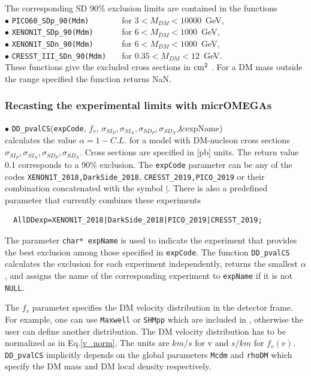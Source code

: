 \documentclass[12pt,a4paper]{article}
\begin{document}
\noindent
The corresponding SD 90\% exclusion limits are contained in the functions\\

\noindent 
$\bullet$ \verb|PICO60_SDp_90(Mdm)       | for  $ 3 < M_{DM} < 10000$~GeV,  \cite{Amole:2019fdf} \\
\noindent
$\bullet$ \verb|XENON1T_SDp_90(Mdm)      | for  $ 6 <  M_{DM} < 1000$~GeV, \cite{Aprile:2019dbj} \\
\noindent
$\bullet$ \verb|XENON1T_SDn_90(Mdm)      | for  $ 6 <  M_{DM} < 1000$~GeV, \cite{Aprile:2019dbj} \\
\noindent
$\bullet$ \verb|CRESST_III_SDn_90(Mdm)   |  for $ 0.35 < M_{DM} < 12$~GeV. ~\cite{Abdelhameed:2019hmk}\\


These functions give the  excluded cross sections in ${\rm cm}^2$ . For a DM mass outside the range specified the function returns NaN.

\subsubsection{Recasting the experimental limits with  micrOMEGAs}  
\label{Recasting}


\noindent
$\bullet$ \verb|DD_pvalCS|(\verb|expCode|, $f_v$, $\sigma_{SI_P},\sigma_{SI_N},\sigma_{SD_P}, \sigma_{SD_N}$,\&expName)\\
calculates the  value $\alpha= 1-C.L.$  for a model with DM-nucleon cross sections 
$\sigma_{SI_P},\sigma_{SI_N},\sigma_{SD_P}, \sigma_{SD_N}$. Cross sections are specified in
[pb] units. The return value 0.1 corresponds to a 90\% exclusion.   
 The {\tt expCode} parameter can be any of the codes  \verb|XENON1T_2018,DarkSide_2018|, \verb|CRESST_2019,PICO_2019| or their combination concatenated with the symbol
$\mid$. There is also a predefined parameter that  currently combines these experiments 
\begin{verbatim}
  AllDDexp=XENON1T_2018|DarkSide_2018|PICO_2019|CRESST_2019;
\end{verbatim}

The parameter {\tt char* expName}  is used to indicate the   experiment that  provides
the best exclusion among those specified in  {\tt expCode}.   The function {\tt DD\_pvalCS } calculates the
exclusion for each experiment  independently, returns the smallest $\alpha$, and assigns the 
name of the corresponding experiment to  {\tt expName}  if it is not {\tt NULL}.  

The $f_v$ parameter specifies the DM velocity distribution in the detector frame. For
example, one can use   {\tt Maxwell} or {\tt SHMpp} which are
included in \micro, 
otherwise the user can define another distribution.   
The DM velocity distribution  has to be normalized  as in Eq.\ref{v_norm}.
 The units  are $km/s$ for v and $s/km$ for  $f_v(v)$. {\tt DD\_pvalCS} implicitly depends on the 
global parameters  {\tt Mcdm}  and  {\tt rhoDM} which specify the DM mass and DM  local density respectively.
\end{document}
